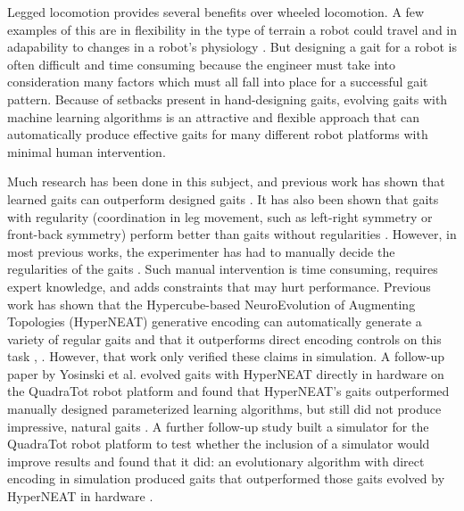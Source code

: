 Legged locomotion provides several benefits over wheeled locomotion. 
A few examples of this are in flexibility in the type of terrain a robot could travel and in adapability to changes in a robot's physiology \cite{bongard:lipson}.
But designing a gait for a robot is often difficult and time consuming because the engineer must take into consideration many factors which must all fall into place for a successful gait pattern. 
Because of setbacks present in hand-designing gaits, evolving gaits with machine learning algorithms is an attractive and flexible approach that can automatically produce effective gaits for many different robot platforms with minimal human intervention. 

Much research has been done in this subject, and previous work has shown that learned gaits can outperform designed gaits \cite{valsalam:mii,kohl:stone,hornby1,hornby2}. %
It has also been shown that gaits with regularity (coordination in leg movement, such as left-right symmetry or front-back symmetry) perform better than gaits without regularities \cite{valsalam:mii,clune2,clune1,clune3}. %
However, in most previous works, the experimenter has had to manually decide the regularities of the gaits \cite{valsalam:mii,tellez,beer,raibert} . %
Such manual intervention is time consuming, requires expert knowledge, and adds constraints that may hurt performance. 
Previous work has shown that the Hypercube-based NeuroEvolution of Augmenting Topologies (HyperNEAT) generative encoding \cite{stanley1} can automatically generate a variety of regular gaits and that it outperforms direct encoding controls on this task \cite{clune1}, \cite{clune2}. 
However, that work only verified these claims in simulation. 
A follow-up paper by Yosinski et al. evolved gaits with HyperNEAT directly in hardware on the QuadraTot robot platform and found that HyperNEAT's gaits outperformed manually designed parameterized learning algorithms, but still did not produce impressive, natural gaits \cite{yos:clune}. 
A further follow-up study built a simulator for the QuadraTot robot platform to test whether the inclusion of a simulator would improve results and found that it did:  an evolutionary algorithm with direct encoding in simulation produced gaits that outperformed those gaits evolved by HyperNEAT in hardware \cite{glette}. %
